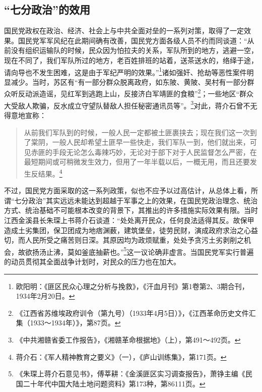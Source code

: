 \subsection{“七分政治”的效用}


国民党政权在政治、经济、社会上与中共全面对垒的一系列对策，取得了一定效果。国民党军军风纪在此期间确有改善，国民党方面各级人员不约而同谈道：“从前没有组织运输队的时候，民众因为怕拉夫的关系，军队所到的地方，逃避一空，现在不同了，我们军队所过的地方，老百姓排班的站着，送茶送水的，络绎于途，请向导也不发生困难，这是由于军纪严明的效果。”\footnote{欧阳明：《匪区民众心理之分析与挽救》，《汗血月刊》第1卷第2、3期合刊，1934年2月20日。}诸如强奸、抢劫等恶性案件明显减少。当时，苏区有“有一部分群众脱离政府，如东陂、黄陂、吴村有一部分群众听反动派造谣，见红军到逃跑上山，反接济白军靖匪的食粮”\footnote{《江西省苏维埃政府训令（第九号）（1933年4月5日）》，《江西革命历史文件汇集（1933～1934年）》，第87页。}；一些地区“群众大受敌人欺骗，反水成立守望队替敌人担任秘密通讯员等”。\footnote{《中共湘赣省委工作报告》，《湘赣革命根据地》（上），第491～492页。}对此，蒋介石曾不无得意地宣称：

\begin{quote}

从前我们军队到的时候，一般人民一定都被土匪裹挟去；现在我们这一次到了棠阴，一般人民却希望土匪早一些快走，我们军队一到，他们就出来，可见赤匪的手段无论怎么毒辣巧妙，无论对于部下对于人民监督怎么严密，在最短期间或可稍微发生效力，但用了一年半载以后，一概无用，而且还要发生反结果。\footnote{蒋介石：《军人精神教育之要义》（一），《庐山训练集》，第171页。}
\end{quote}


不过，国民党方面采取的这一系列政策，似也不应予以过高估计，从总体上看，所谓“七分政治”其实远远未能达到超越于军事之上的效果，在国民党政治理念、统治方式、统治基础不可能根本改变的背景下，其推出的许多措施实际效果有限。当时江西金溪县长朱琛上书蒋介石谈道：“处处离开民众，任何良法适得其反。故保甲造成土劣集团，保卫团成为地痞渊薮，建筑堡垒，徒劳民财，演成政府求治之心益切，而人民所受之痛苦则日深。其原因均为政烦赋重，处处予贪污土劣剥削之机会，故欲扬汤止沸，莫如釜底抽薪也。”\footnote{《朱琛上蒋介石意见书》，傅莘耕：《金溪匪区实习调查报告》，萧铮主编《民国二十年代中国大陆土地问题资料》第173种，第86111页。}这一议论确非虚言。当国民党军实行普遍的动员贯彻其全面战争计划时，对民众的压力也在加大。



